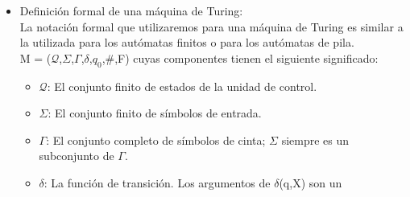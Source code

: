 \documentclass[12pt,a4paper,spanish]{book}
\begin{document}
\begin{itemize}
un s\'imbolo denominado espacio en blanco.\\ El espacio en blanco es un s\'imbolo de
cinta, pero no un s\'imbolo de entrada, y puede haber tambi\'en otros s\'imbolos de
cinta adem\'as de los s\'imbolos de entrada y del espacio en blanco.\\
Existe una cabeza de cinta que siempre est\'a situada sobre una de las casillas de
la cinta. Se dice que la m\'aquina de Turing est\'a se\~nalando dicha casilla. Al
principio, la cabeza de la cinta se encuentra en la casilla de entrada que se encuentra
m\'as a la izquierda y no es un blanco.\\
Un movimiento de la m\'aquina de Turing es una funci\'on del estado de la unidad de
control, del s\'imbolo de la cinta y de la direcci\'on. En un movimiento, la m\'aquina de
Turing:
\begin{enumerate}
\item Cambiar\'a de estado. Opcionalmente, el siguiente estado puede ser el mismo
que el actual.
\item Escribir\'a un s\'imbolo de cinta en la casilla se\~nalada por la cabeza. Este
s\'imbolo de cinta sustituye al s\'imbolo que estuviera anteriormente en la casilla.
Opcionalmente, el s\'imbolo escrito puede ser el mismo que hab\'ia en dicha casilla.
\item Mover\'a la cabeza de la cinta hacia la izquierda o hacia la derecha. En nuestro
formalismo, no se exige que haya un movimiento, y se permite que la cabeza
permanezca en el mismo lugar.
\end{enumerate}
\newpage
\item Definici\'on formal de una m\'aquina de Turing:\\
\newline
La notaci\'on formal que utilizaremos para una m\'aquina de Turing es similar a la
utilizada para los aut\'omatas finitos o para los aut\'omatas de pila.\\
M = ($\mathcal{Q}$,$\Sigma$,$\Gamma$,$\delta$,$q_{0}$,\#,F)
cuyas componentes tienen el siguiente significado:
\begin{itemize}
\item $\mathcal{Q}$: El conjunto finito de estados de la unidad de control.
\item $\Sigma$: El conjunto finito de s\'imbolos de entrada.
\item $\Gamma$: El conjunto completo de s\'imbolos de cinta; $\Sigma$ siempre es un
subconjunto de $\Gamma$.
\item $\delta$: La funci\'on de transici\'on. Los argumentos de $\delta$(q,X) son un

\end{itemize}
\end{itemize}
\end{document}
